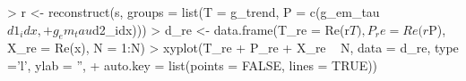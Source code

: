 \begin{CodeChunk}
\begin{CodeInput}


> r <- reconstruct(s, groups = list(T = g_trend, P = c(g_em_tau$d1_idx, 
+                                                      g_em_tau$d2_idx)))
> d_re <- data.frame(T_re = Re(r$T), P_re = Re(r$P),  X_re = Re(x), N = 1:N)
> xyplot(T_re + P_re + X_re  ~ N, data = d_re, type ='l', ylab = '',
+        auto.key = list(points = FALSE, lines = TRUE))
\end{CodeInput}

\end{CodeChunk}